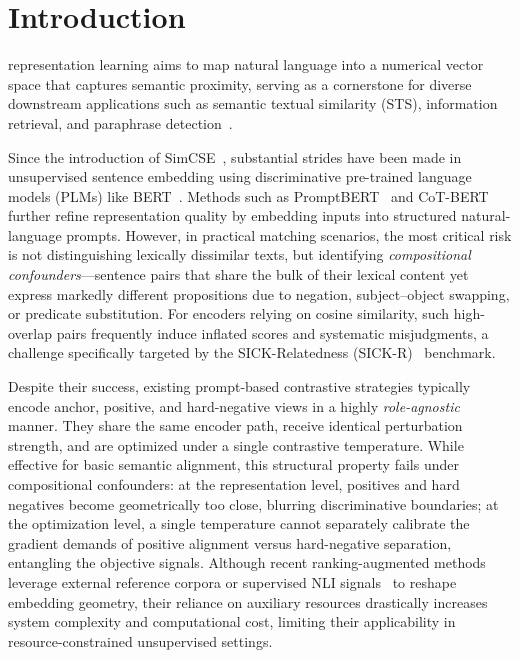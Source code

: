 \documentclass[lettersize,journal]{IEEEtran}
\begin{document}
\section{Introduction}
\label{sec:intro}


 representation learning aims to map natural language into a numerical vector space that captures semantic proximity, serving as a cornerstone for diverse downstream applications such as semantic textual similarity (STS), information retrieval, and paraphrase detection~\cite{sts3kcl}.

Since the introduction of SimCSE~\cite{simcse}, substantial strides have been made in unsupervised sentence embedding using discriminative pre-trained language models (PLMs) like BERT~\cite{bert}. Methods such as PromptBERT~\cite{promptbert} and CoT-BERT~\cite{cotbert} further refine representation quality by embedding inputs into structured natural-language prompts. However, in practical matching scenarios, the most critical risk is not distinguishing lexically dissimilar texts, but identifying \emph{compositional confounders}---sentence pairs that share the bulk of their lexical content yet express markedly different propositions due to negation, subject--object swapping, or predicate substitution. For encoders relying on cosine similarity, such high-overlap pairs frequently induce inflated scores and systematic misjudgments, a challenge specifically targeted by the SICK-Relatedness (SICK-R)~\cite{sick} benchmark.

Despite their success, existing prompt-based contrastive strategies typically encode anchor, positive, and hard-negative views in a highly \emph{role-agnostic} manner. They share the same encoder path, receive identical perturbation strength, and are optimized under a single contrastive temperature. While effective for basic semantic alignment, this structural property fails under compositional confounders: at the representation level, positives and hard negatives become geometrically too close, blurring discriminative boundaries; at the optimization level, a single temperature cannot separately calibrate the gradient demands of positive alignment versus hard-negative separation, entangling the objective signals. Although recent ranking-augmented methods~\cite{rankcse,rankencoder} leverage external reference corpora or supervised NLI signals~\cite{raoe} to reshape embedding geometry, their reliance on auxiliary resources drastically increases system complexity and computational cost, limiting their applicability in resource-constrained unsupervised settings.
\end{document}
